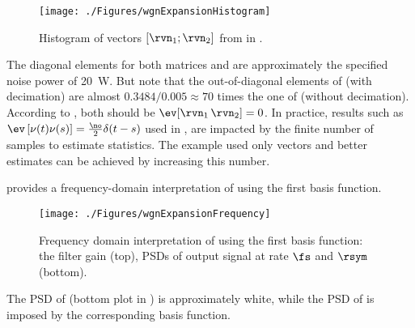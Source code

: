 \begin{figure}
\centering
\texttt{[image: ./Figures/wgnExpansionHistogram]}
\caption{Histogram of vectors $[\rvn_1; \rvn_2]$ from  in .\label{fig:wgnExpansionHistogram}}
\end{figure}

The diagonal elements for both matrices  and  are approximately the specified noise power of 20~W.
But note that the out-of-diagonal elements of  (with decimation) are almost $0.3484/0.005 \approx 70$ times the one of  (without decimation). According to , both should be $\ev[\rvn_1 \, \rvn_2] = 0$. 
In practice, results such as $\ev \left[ \nu(t) \nu(s) \right] = \frac{\no}{2} \delta(t-s)$ used in , are impacted by the finite number of samples to estimate statistics. The example used only
 vectors and better estimates can be achieved by increasing this number.

 provides a frequency-domain interpretation of  using the first basis function.

\begin{figure}
\centering
\texttt{[image: ./Figures/wgnExpansionFrequency]}
\caption{Frequency domain interpretation of  using the first basis function: the filter gain (top), PSDs of output signal at rate $\fs$ and $\rsym$ (bottom).\label{fig:wgnExpansionFrequency}}
\end{figure}

The PSD of  (bottom plot in ) is approximately white, while the PSD of  is imposed by the corresponding basis function.
%
\eApplication


